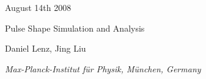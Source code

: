 \documentclass[11pt, a4paper]{article}
\begin{document}

\begin{titlepage}

\begin{figure}
\end{figure} 

\hspace{10.8cm} August 14th 2008 \\ 

\begin{center}

\vspace{1.0cm}

{\Large Pulse Shape Simulation and Analysis\\ } 

\vspace{0.5cm} 


\vspace{1.0cm}

{\large 
Daniel Lenz, Jing Liu
}

\vspace{1.0cm}

{\it 
Max-Planck-Institut f\"ur Physik, M\"unchen, Germany
} 
\vspace{2.0cm} 
\begin{abstract}
  This note contains 1. a detailed documentation of the pulse shape   simulation codes, 2. some basic verifications of the simulation   codes, and 3. some simple applications of the simulation.
\end{abstract}
\end{center} 

\end{titlepage} 



\tableofcontents

\pagebreak \setcounter{page}{1} 

\end{document}
